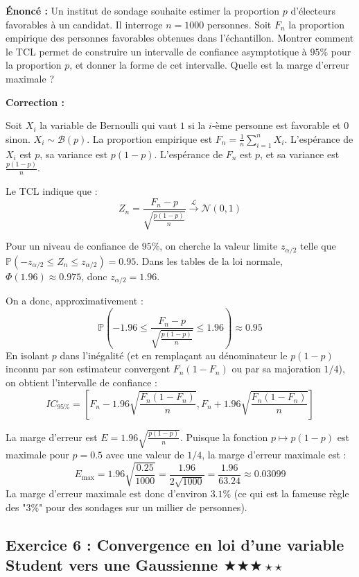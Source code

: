 \documentclass[11pt,a4paper]{article}
\begin{document}
\textbf{Énoncé :}
Un institut de sondage souhaite estimer la proportion $p$ d'électeurs favorables à un candidat.
Il interroge $n=1000$ personnes. Soit $F_n$ la proportion empirique des personnes favorables obtenues dans l'échantillon.
Montrer comment le TCL permet de construire un intervalle de confiance asymptotique à $95\%$ pour la proportion $p$, et donner la forme de cet intervalle. Quelle est la marge d'erreur maximale ?

\textbf{Correction :}

Soit $X_i$ la variable de Bernoulli qui vaut $1$ si la $i$-ème personne est favorable et $0$ sinon. $X_i \sim \mathcal{B}(p)$.
La proportion empirique est $F_n = \frac{1}{n} \sum_{i=1}^n X_i$.
L'espérance de $X_i$ est $p$, sa variance est $p(1-p)$.
L'espérance de $F_n$ est $p$, et sa variance est $\frac{p(1-p)}{n}$.

Le TCL indique que :
$$Z_n = \frac{F_n - p}{\sqrt{\frac{p(1-p)}{n}}} \xrightarrow{\mathcal{L}} \mathcal{N}(0, 1)$$

Pour un niveau de confiance de $95\%$, on cherche la valeur limite $z_{\alpha/2}$ telle que $\mathbb{P}(-z_{\alpha/2} \le Z_n \le z_{\alpha/2}) = 0.95$.
Dans les tables de la loi normale, $\Phi(1.96) \approx 0.975$, donc $z_{\alpha/2} = 1.96$.

On a donc, approximativement :
$$\mathbb{P}\left( -1.96 \le \frac{F_n - p}{\sqrt{\frac{p(1-p)}{n}}} \le 1.96 \right) \approx 0.95$$
En isolant $p$ dans l'inégalité (et en remplaçant au dénominateur le $p(1-p)$ inconnu par son estimateur convergent $F_n(1-F_n)$ ou par sa majoration $1/4$), on obtient l'intervalle de confiance :
$$IC_{95\%} = \left[ F_n - 1.96 \sqrt{\frac{F_n(1-F_n)}{n}} , F_n + 1.96 \sqrt{\frac{F_n(1-F_n)}{n}} \right]$$

La marge d'erreur est $E = 1.96 \sqrt{\frac{p(1-p)}{n}}$.
Puisque la fonction $p \mapsto p(1-p)$ est maximale pour $p=0.5$ avec une valeur de $1/4$, la marge d'erreur maximale est :
$$E_{\max} = 1.96 \sqrt{\frac{0.25}{1000}} = \frac{1.96}{2 \sqrt{1000}} = \frac{1.96}{63.24} \approx 0.03099$$
La marge d'erreur maximale est donc d'environ $3.1\%$ (ce qui est la fameuse règle des "$3\%$" pour des sondages sur un millier de personnes).


\vspace{1cm}
\subsection*{Exercice 6 : Convergence en loi d'une variable Student vers une Gaussienne \quad $\bigstar\bigstar\bigstar\star\star$}
\end{document}
